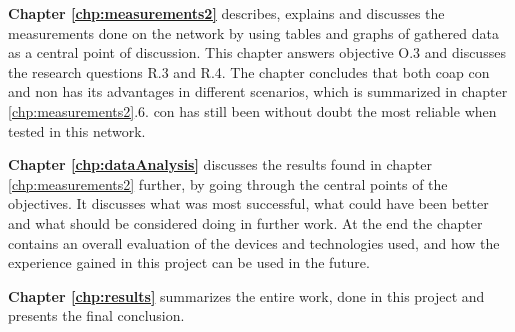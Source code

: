\noindent \textbf{Chapter \ref{chp:measurements2}} describes, explains and discusses the measurements done on the network by using tables and graphs of gathered data as a central point of discussion. This chapter answers objective O.3 and discusses the research questions R.3 and R.4. The chapter concludes that both \gls{coap} \gls{con} and \gls{non} has its advantages in different scenarios, which is summarized in chapter \ref{chp:measurements2}.6. \gls{con} has still been without doubt the most reliable when tested in this network. 

\noindent \textbf{Chapter \ref{chp:dataAnalysis}} discusses the results found in chapter \ref{chp:measurements2} further, by going through the central points of the objectives. It discusses what was most successful, what could have been better and what should be considered doing in further work. At the end the chapter contains an overall evaluation of the devices and technologies used, and how the experience gained in this project can be used in the future. 

\noindent \textbf{Chapter \ref{chp:results}} summarizes the entire work, done in this project and presents the final conclusion.  






